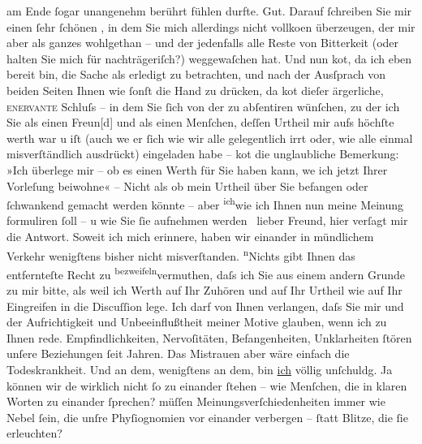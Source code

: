                am Ende{ }ſogar unangenehm berührt fühlen durfte. Gut. Darauf{ }ſchreiben Sie mir einen{ }ſehr {\pb}ſchönen \label{K_L02989-1v}\label{K_L02989-1}, in dem Sie mich allerdings nicht vollko{\geminationm}en
               überzeugen, der mir aber als ganzes wohlgethan – und der jedenfalls alle Reste von
               Bitterkeit (oder halten Sie mich für nachträgeriſch?) weggewaſchen hat. Und nun ko{\geminationm}t, da ich eben bereit bin, die Sache als erledigt zu
               betrachten, und nach der Ausſprach von beiden Seiten {\pb}Ihnen wie{ }ſonſt die Hand zu drücken, da ko{\geminationm}t dieſer ärgerliche, \textsc{enervante} Schluſs – in dem Sie{ }ſich von der \label{K_L02989-2v}\label{K_L02989-2} zu abſentiren wünſchen, zu der ich Sie als einen Freun{[}d{]}
               und als einen Menſchen, deſſen Urtheil mir aufs höchſte werth war u iſt (auch we{\geminationn} er{ }ſich wie wir alle {\pb}gelegentlich irrt oder, wie alle einmal
               misverſtändlich ausdrückt) eingeladen habe – ko{\geminationm}t die
               unglaubliche Bemerkung: »Ich überlege mir – ob es einen Werth für Sie haben kann,
                  we{\geminationn} ich jetzt Ihrer Vorleſung beiwohne{\dotstwo}« – Nicht als ob mein Urtheil über Sie befangen oder{ }ſchwankend gemacht werden könnte – aber \substVorne{}\textsuperscript{ich}\substDazwischen{}wie\substHinten{} ich Ihnen nun meine {\pb}Meinung
               formuliren{ }ſoll – u wie Sie{ }ſie aufnehmen werden {\dotsfive} lieber Freund, hier verſagt mir die Antwort. Soweit ich
               mich erinnere, haben wir einander in mündlichem Verkehr wenigſtens bisher nicht
               misverſtanden. \substVorne{}\textsuperscript{n}\substDazwischen{}N\substHinten{}ichts gibt Ihnen das
               entfernteſte Recht zu \substVorne{}\textsuperscript{bezweifeln}\substDazwischen{}vermuthen\substHinten{}, daſs ich Sie aus einem andern {\pb}Grunde zu mir bitte, als weil ich Werth auf Ihr Zuhören und auf Ihr Urtheil wie auf
               Ihr Eingreifen in die Discuſſion lege. Ich darf von Ihnen verlangen, daſs Sie mir und
               der Aufrichtigkeit \introOben{}und Unbeeinflußtheit\introOben{} meiner Motive
               glauben, wenn ich zu Ihnen rede. Empfindlichkeiten, Nervoſitäten, Befan{\pb}genheiten, Unklarheiten{ }ſtören unſere
               Beziehungen{ }ſeit Jahren. Das Mistrauen aber wäre einfach die Todeskrankheit. Und an
               dem, wenigſtens an dem, bin \uline{ich} völlig unſchuldg. Ja
               können wir de{\geminationn} wirklich nicht{ }ſo zu einander{ }ſtehen –
               wie Menſchen, die in klaren Worten zu einander{ }ſprechen? {\pb}müſſen Meinungsverſchiedenheiten immer wie
               Nebel{ }ſein, die unſre Phyſiognomien vor einander verbergen –{ }ſtatt Blitze, die{ }ſie
               erleuchten?\pend
           
